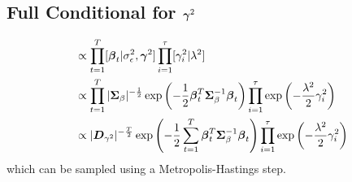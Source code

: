 \documentclass[fleqn]{article}
\def\bm#1{\mbox{\boldmath $#1$}}
\begin{document}
% 
\subsection{Full Conditional for $\bm{\gamma}^2$}
\begin{align*}
[\bm{\gamma}^2 | \cdot] & \propto \prod_{t = 1}^T [\bm{\beta}_t | \sigma^2_\epsilon, \bm{\gamma}^2] \prod_{i = 1}^\tau [\gamma^2_i | \lambda^2]\\
 & \propto \prod_{t = 1}^T | \bm{\Sigma}_\beta |^{ - \frac{1} {2}} \exp{ \left( - \frac{1} {2} \bm{\beta}_t^T \bm{\Sigma}_\beta^{ - 1} \bm{\beta}_t \right) } \prod_{i = 1}^\tau \exp{ \left(-\frac{\lambda^2} {2} \gamma^2_i \right) }\\
%
& \propto |\bm{D}_{\gamma^2}|^{ - \frac{T} {2}} \exp{ \left( - \frac{1} {2} \sum_{t = 1}^T \bm{\beta}_t^T \bm{\Sigma}_\beta^{ - 1} \bm{\beta}_t \right) } \prod_{i = 1}^\tau \exp{ \left(-\frac{\lambda^2} {2} \gamma^2_i \right) }\\
%
\end{align*}
%
which can be sampled using a Metropolis-Hastings step.
%
\end{document}
